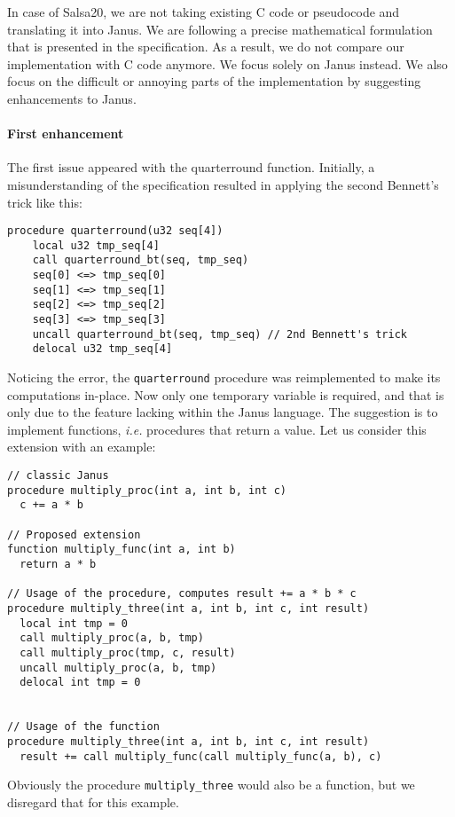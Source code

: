 \documentclass[a4paper,10pt,openright]{memoir}
\newcommand{\ie}{\emph{i.e.}\xspace}
\newcommand{\code}[1]{\texttt{#1}}
\begin{document}
In case of Salsa20, we are not taking existing C code or pseudocode and 
translating it into Janus. We are following a precise mathematical 
formulation that is presented in the specification\cite{salsa}. As a 
result, we do not compare our implementation with C code anymore. We 
focus solely on Janus instead. We also focus on the difficult or 
annoying parts of the implementation by suggesting enhancements to 
Janus.

\paragraph{First enhancement}

The first issue appeared with the quarterround function. Initially, a 
misunderstanding of the specification resulted in applying the second 
Bennett's trick like this:

\begin{lstlisting}[language=Janus]
procedure quarterround(u32 seq[4])
	local u32 tmp_seq[4]
	call quarterround_bt(seq, tmp_seq)
	seq[0] <=> tmp_seq[0]
	seq[1] <=> tmp_seq[1]
	seq[2] <=> tmp_seq[2]
	seq[3] <=> tmp_seq[3]
	uncall quarterround_bt(seq, tmp_seq) // 2nd Bennett's trick
	delocal u32 tmp_seq[4]
\end{lstlisting}

Noticing the error, the \code{quarterround} procedure was reimplemented 
to make its computations in-place. Now only one temporary variable is 
required, and that is only due to the feature lacking within the Janus 
language. The suggestion is to implement functions, \ie procedures that 
return a value. Let us consider this extension with an example:

\begin{lstlisting}[language=Janus]
// classic Janus
procedure multiply_proc(int a, int b, int c)
  c += a * b

// Proposed extension
function multiply_func(int a, int b)
  return a * b

// Usage of the procedure, computes result += a * b * c
procedure multiply_three(int a, int b, int c, int result)
  local int tmp = 0
  call multiply_proc(a, b, tmp)
  call multiply_proc(tmp, c, result)
  uncall multiply_proc(a, b, tmp)
  delocal int tmp = 0


// Usage of the function
procedure multiply_three(int a, int b, int c, int result)
  result += call multiply_func(call multiply_func(a, b), c)
\end{lstlisting}

Obviously the procedure \code{multiply\_three} would also be a function, 
but we disregard that for this example.
\end{document}
